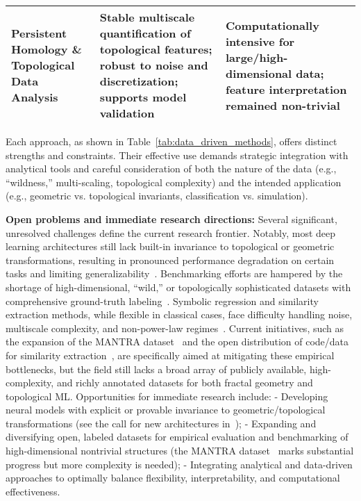 \documentclass[sigconf]{acmart}
\begin{document}
\begin{table*}[htbp]
\begin{adjustbox}{max width=\textwidth}
\begin{tabular}{lll}
Persistent Homology \& Topological Data Analysis~\cite{ref39} & Stable multiscale quantification of topological features; robust to noise and discretization; supports model validation & Computationally intensive for large/high-dimensional data; feature interpretation remained non-trivial \\
\bottomrule
\end{tabular}
\end{adjustbox}
\end{table*}

Each approach, as shown in Table~\ref{tab:data_driven_methods}, offers distinct strengths and constraints. Their effective use demands strategic integration with analytical tools and careful consideration of both the nature of the data (e.g., ``wildness,'' multi-scaling, topological complexity) and the intended application (e.g., geometric vs. topological invariants, classification vs. simulation).

\textbf{Open problems and immediate research directions:} Several significant, unresolved challenges define the current research frontier. Notably, most deep learning architectures still lack built-in invariance to topological or geometric transformations, resulting in pronounced performance degradation on certain tasks and limiting generalizability~\cite{ref26,ref39}. Benchmarking efforts are hampered by the shortage of high-dimensional, ``wild,'' or topologically sophisticated datasets with comprehensive ground-truth labeling~\cite{ref26,ref39}. Symbolic regression and similarity extraction methods, while flexible in classical cases, face difficulty handling noise, multiscale complexity, and non-power-law regimes~\cite{ref65}. Current initiatives, such as the expansion of the MANTRA dataset~\cite{ref26} and the open distribution of code/data for similarity extraction~\cite{ref65}, are specifically aimed at mitigating these empirical bottlenecks, but the field still lacks a broad array of publicly available, high-complexity, and richly annotated datasets for both fractal geometry and topological ML. Opportunities for immediate research include:
- Developing neural models with explicit or provable invariance to geometric/topological transformations (see the call for new architectures in~\cite{ref26});
- Expanding and diversifying open, labeled datasets for empirical evaluation and benchmarking of high-dimensional nontrivial structures (the MANTRA dataset~\cite{ref26} marks substantial progress but more complexity is needed);
- Integrating analytical and data-driven approaches to optimally balance flexibility, interpretability, and computational effectiveness.
\end{document}
